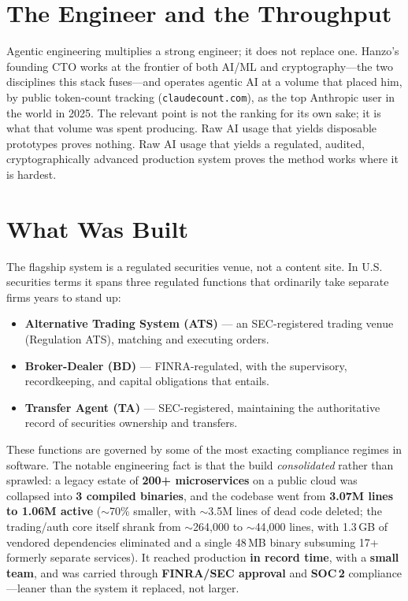\documentclass[11pt,letterpaper]{article}
\begin{document}
\tableofcontents
\newpage

\section{The Engineer and the Throughput}

Agentic engineering multiplies a strong engineer; it does not replace one. Hanzo's
founding CTO works at the frontier of both AI/ML and cryptography---the two
disciplines this stack fuses---and operates agentic AI at a volume that placed him,
by public token-count tracking (\texttt{claudecount.com}), as the top Anthropic
user in the world in 2025. The relevant point is not the ranking for its own sake;
it is what that volume was spent producing. Raw AI usage that yields disposable
prototypes proves nothing. Raw AI usage that yields a regulated, audited,
cryptographically advanced production system proves the method works where it is
hardest.

\section{What Was Built}

The flagship system is a regulated securities venue, not a content site. In U.S.
securities terms it spans three regulated functions that ordinarily take separate
firms years to stand up:

\begin{itemize}
  \item \textbf{Alternative Trading System (ATS)} --- an SEC-registered trading
  venue (Regulation ATS), matching and executing orders.
  \item \textbf{Broker-Dealer (BD)} --- FINRA-regulated, with the supervisory,
  recordkeeping, and capital obligations that entails.
  \item \textbf{Transfer Agent (TA)} --- SEC-registered, maintaining the
  authoritative record of securities ownership and transfers.
\end{itemize}

These functions are governed by some of the most exacting compliance regimes in
software. The notable engineering fact is that the build \emph{consolidated} rather
than sprawled: a legacy estate of \textbf{200+ microservices} on a public cloud was
collapsed into \textbf{3 compiled binaries}, and the codebase went from
\textbf{3.07M lines to 1.06M active} ($\sim$70\% smaller, with $\sim$3.5M lines of
dead code deleted; the trading/auth core itself shrank from $\sim$264{,}000 to
$\sim$44{,}000 lines, with 1.3\,GB of vendored dependencies eliminated and a single
48\,MB binary subsuming 17+ formerly separate services). It reached production
\textbf{in record time}, with a \textbf{small team}, and was carried through
\textbf{FINRA/SEC approval} and \textbf{SOC\,2} compliance---leaner than the system
it replaced, not larger.
\end{document}
